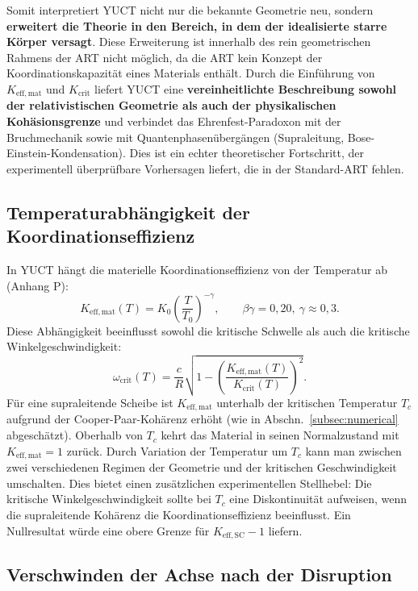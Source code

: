 \documentclass[12pt,a4paper]{article}
\newcommand{\Keffmat}{K_{\mathrm{eff,mat}}}
\newcommand{\Kcrit}{K_{\mathrm{crit}}}
\begin{document}
	Somit interpretiert YUCT nicht nur die bekannte Geometrie neu, sondern \textbf{erweitert die Theorie in den Bereich, in dem der idealisierte starre Körper versagt}. Diese Erweiterung ist innerhalb des rein geometrischen Rahmens der ART nicht möglich, da die ART kein Konzept der Koordinationskapazität eines Materials enthält. Durch die Einführung von \(\Keffmat\) und \(\Kcrit\) liefert YUCT eine \textbf{vereinheitlichte Beschreibung sowohl der relativistischen Geometrie als auch der physikalischen Kohäsionsgrenze} und verbindet das Ehrenfest-Paradoxon mit der Bruchmechanik sowie mit Quantenphasenübergängen (Supraleitung, Bose-Einstein-Kondensation). Dies ist ein echter theoretischer Fortschritt, der experimentell überprüfbare Vorhersagen liefert, die in der Standard-ART fehlen.
	
	\subsection{Temperaturabhängigkeit der Koordinationseffizienz}
	
	In YUCT hängt die materielle Koordinationseffizienz von der Temperatur ab (Anhang P):
	\[
	K_{\mathrm{eff,mat}}(T) = K_0 \left( \frac{T}{T_0} \right)^{-\gamma}, \qquad \beta\gamma = 0,20,\ \gamma \approx 0,3.
	\]
	Diese Abhängigkeit beeinflusst sowohl die kritische Schwelle als auch die kritische Winkelgeschwindigkeit:
	\[
	\omega_{\text{crit}}(T) = \frac{c}{R} \sqrt{1 - \left( \frac{K_{\mathrm{eff,mat}}(T)}{K_{\mathrm{crit}}(T)} \right)^2 }.
	\]
	Für eine supraleitende Scheibe ist \(K_{\mathrm{eff,mat}}\) unterhalb der kritischen Temperatur \(T_c\) aufgrund der Cooper-Paar-Kohärenz erhöht (wie in Abschn.~\ref{subsec:numerical} abgeschätzt). Oberhalb von \(T_c\) kehrt das Material in seinen Normalzustand mit \(K_{\mathrm{eff,mat}} = 1\) zurück. Durch Variation der Temperatur um \(T_c\) kann man zwischen zwei verschiedenen Regimen der Geometrie und der kritischen Geschwindigkeit umschalten. Dies bietet einen zusätzlichen experimentellen Stellhebel: Die kritische Winkelgeschwindigkeit sollte bei \(T_c\) eine Diskontinuität aufweisen, wenn die supraleitende Kohärenz die Koordinationseffizienz beeinflusst. Ein Nullresultat würde eine obere Grenze für \(K_{\mathrm{eff,SC}} - 1\) liefern.
	
	\subsection{Verschwinden der Achse nach der Disruption}
	
\end{document}
